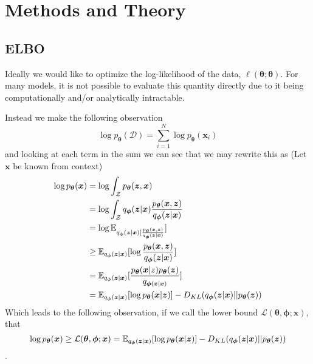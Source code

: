 \chapter{Methods and Theory}
\label{MethodsCh}

\section{ELBO}

Ideally we would like to optimize the log-likelihood of the data,
$\ell(\bm{\theta} ; \bm{\theta})$. For many models, it is not possible to
evaluate this quantity directly due to it being computationally and/or
analytically intractable.

Instead we make the following observation
\begin{equation}
  \label{eq:log_likelihood_sum}
  \log p_{\bm{\theta}}(\mathcal{D}) = \sum_{i=1}^N \log p_{\bm{\theta}}(\bm{x}_i)
\end{equation}
and looking at each term in the sum we can see that we may rewrite this as (Let
$\bm{x}$ be known from context)
\begin{align*}
  \log p_{\bm{\theta}}(\bm{x}) & = \log \int_{\mathcal{Z}} p_{\bm{\theta}}(\bm{z}, \bm{x})\\
                               & = \log \int_{\mathcal{Z}}q_{\bm{\phi}}(\bm{z} | \bm{x}) \frac{p_{\bm{\theta}}(\bm{x}, \bm{z})}{q_{\bm{\phi}}(\bm{z} | \bm{x})} \\
                               & = \log \operatorname{\mathbb{E}}_{q_{\bm{\phi}}(\bm{z} | \bm{x})[\frac{p_{\bm{\theta}}(\bm{x}, \bm{z})}{q_{\bm{\phi}}(\bm{z} | \bm{x})}}] \\
                               & \geq \operatorname{\mathbb{E}}_{q_{\bm{\phi}}(\bm{z} | \bm{x})}[\log \frac{p_{\bm{\theta}}(\bm{x}, \bm{z})}{q_{\bm{\phi}}(\bm{z} | \bm{x})}] \\
                               & = \operatorname{\mathbb{E}}_{q_{\bm{\phi}}(\bm{z} | \bm{x})}[\frac{p_{\bm{\theta}}(\bm{x} | z) p_{\bm{\theta}}(\bm{z})}{q_{\bm{\phi}(\bm{z} | \bm{x})}}] \\
                               & = \operatorname{\mathbb{E}}_{q_{\bm{\phi}}(\bm{z} | \bm{x})}[\log p_{\bm{\theta}}(\bm{x} | \bm{z})] - D_{KL}(q_{\bm{\phi}}(\bm{z} | \bm{x}) || p_{\bm{\theta}}(\bm{z}))
\end{align*}
Which leads to the following observation, if we call the lower bound
$\mathcal{L}(\bm{\theta}, \bm{\phi}; \bm{x})$, that
\begin{equation}
  \label{eq:ELBO_inequality}
  \log p_{\bm{\theta}}(\bm{x}) \geq \mathcal{L}(\bm{\theta}, \bm{\phi}; \bm{x}) = \operatorname{\mathbb{E}}_{q_{\bm{\phi}}(\bm{z} | \bm{x})}[\log p_{\bm{\theta}}(\bm{x} | \bm{z})] - D_{KL}(q_{\bm{\phi}}(\bm{z} | \bm{x}) || p_{\bm{\theta}}(\bm{z}))
\end{equation}.

